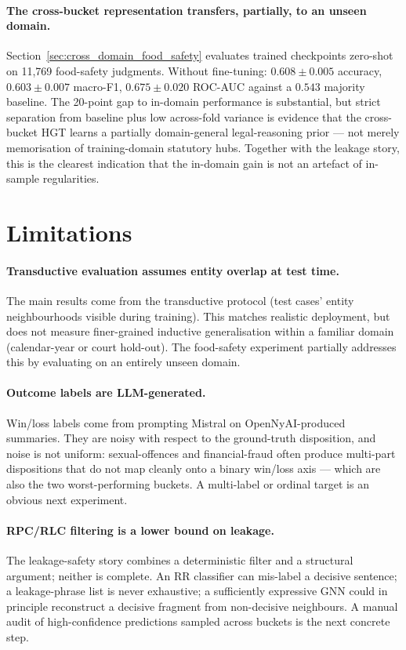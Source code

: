 \paragraph{The cross-bucket representation transfers, partially, to an unseen domain.} Section~\ref{sec:cross_domain_food_safety} evaluates trained checkpoints zero-shot on 11{,}769 food-safety judgments. Without fine-tuning: $0.608\pm0.005$ accuracy, $0.603\pm0.007$ macro-F1, $0.675\pm0.020$ ROC-AUC against a $0.543$ majority baseline. The 20-point gap to in-domain performance is substantial, but strict separation from baseline plus low across-fold variance is evidence that the cross-bucket HGT learns a partially domain-general legal-reasoning prior --- not merely memorisation of training-domain statutory hubs. Together with the leakage story, this is the clearest indication that the in-domain gain is not an artefact of in-sample regularities.

\section{Limitations}

\paragraph{Transductive evaluation assumes entity overlap at test time.} The main results come from the transductive protocol (test cases' entity neighbourhoods visible during training). This matches realistic deployment, but does not measure finer-grained inductive generalisation within a familiar domain (calendar-year or court hold-out). The food-safety experiment partially addresses this by evaluating on an entirely unseen domain.

\paragraph{Outcome labels are LLM-generated.} Win/loss labels come from prompting Mistral on OpenNyAI-produced summaries. They are noisy with respect to the ground-truth disposition, and noise is not uniform: sexual-offences and financial-fraud often produce multi-part dispositions that do not map cleanly onto a binary win/loss axis --- which are also the two worst-performing buckets. A multi-label or ordinal target is an obvious next experiment.

\paragraph{RPC/RLC filtering is a lower bound on leakage.} The leakage-safety story combines a deterministic filter and a structural argument; neither is complete. An RR classifier can mis-label a decisive sentence; a leakage-phrase list is never exhaustive; a sufficiently expressive GNN could in principle reconstruct a decisive fragment from non-decisive neighbours. A manual audit of high-confidence predictions sampled across buckets is the next concrete step.

